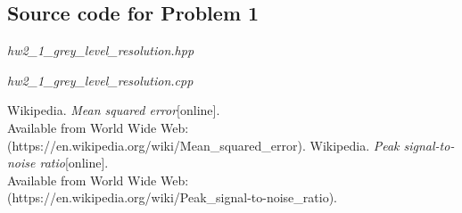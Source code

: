 \documentclass[a4paper, 11pt]{article}
\begin{document}
\subsection*{Source code for Problem 1}
\it{hw2\_1\_grey\_level\_resolution.hpp}
\begin{figure}[h]
  \centering
\end{figure}
\newpage
\it{hw2\_1\_grey\_level\_resolution.cpp}
\begin{figure}[h!]
  \centering
\end{figure}
\begin{figure}[h!]
  \centering
\end{figure}
\begin{figure}[h!]
  \centering
\end{figure}
\newline
\begin{thebibliography}{9}
   Wikipedia. \emph{Mean squared error}[online]. \\
  Available from World Wide Web: (https://en.wikipedia.org/wiki/Mean\_squared\_error).
   Wikipedia. \emph{Peak signal-to-noise ratio}[online].\\
  Available from World Wide Web: \\
  (https://en.wikipedia.org/wiki/Peak\_signal-to-noise\_ratio).
\end{thebibliography}
\end{document}
